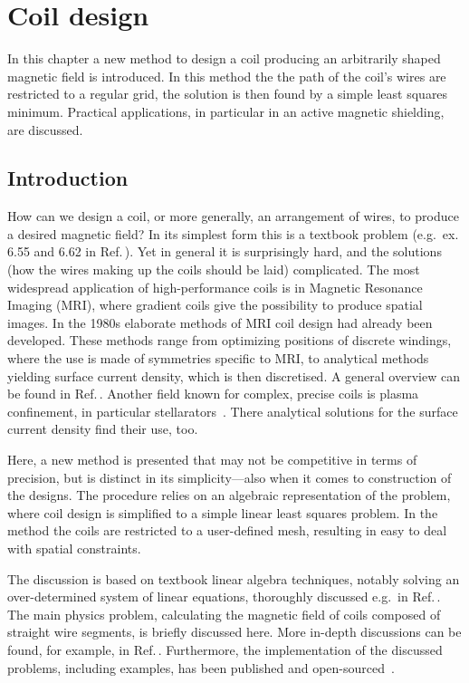 \chapter{Coil design}
\label{ch:coil_design}

In this chapter a new method to design a coil producing an arbitrarily shaped magnetic field is introduced. In this method the the path of the coil's wires are restricted to a regular grid, the solution is then found by a simple least squares minimum. Practical applications, in particular in an active magnetic shielding, are discussed.




\section{Introduction}
How can we design a coil, or more generally, an arrangement of wires, to produce a desired magnetic field? In its simplest form this is a textbook problem (e.g.\ ex. 6.55 and 6.62 in Ref.\,\cite{Purcell}).
Yet in general it is surprisingly hard, and the solutions (how the wires making up the coils should be laid) complicated.
The most widespread application of high-performance coils is in Magnetic Resonance Imaging (MRI), where gradient coils give the possibility to produce spatial images.
In the 1980s elaborate methods of MRI coil design had already been developed.
These methods range from optimizing positions of discrete windings, where the use is made of symmetries specific to MRI, to analytical methods yielding surface current density, which is then discretised.
A general overview can be found in Ref.\,\cite{Turner1993}.
Another field known for complex, precise coils is plasma confinement, in particular stellarators~\cite{Beidler1990}. There analytical solutions for the surface current density find their use, too.

Here, a new method is presented that may not be competitive in terms of precision, but is distinct in its simplicity---also when it comes to construction of the designs. The procedure relies on an algebraic representation of the problem, where coil design is simplified to a simple linear least squares problem.
In the method the coils are restricted to a user-defined mesh, resulting in easy to deal with spatial constraints.

The discussion is based on textbook linear algebra techniques, notably solving an over-determined system of linear equations, thoroughly discussed e.g.\ in Ref.\,\cite{Anton}.
The main physics problem, calculating the magnetic field of coils composed of straight wire segments, is briefly discussed here.
More in-depth discussions can be found, for example, in Ref.\,\cite{Griffith}.
Furthermore, the implementation of the discussed problems, including examples, has been published and open-sourced~\cite{Coilsjlcode}.

